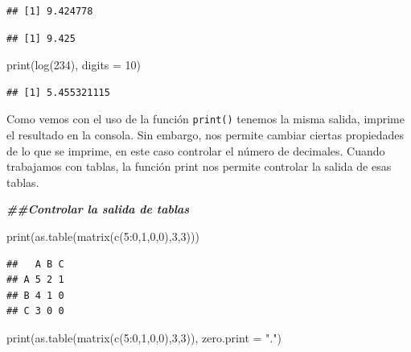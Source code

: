 \documentclass[
]{article}
\newenvironment{Shaded}{\begin{snugshade}}{\end{snugshade}}
\newcommand{\AttributeTok}[1]{\textcolor[rgb]{0.77,0.63,0.00}{#1}}
\newcommand{\DecValTok}[1]{\textcolor[rgb]{0.00,0.00,0.81}{#1}}
\newcommand{\DocumentationTok}[1]{\textcolor[rgb]{0.56,0.35,0.01}{\textbf{\textit{#1}}}}
\newcommand{\FunctionTok}[1]{\textcolor[rgb]{0.00,0.00,0.00}{#1}}
\newcommand{\NormalTok}[1]{#1}
\newcommand{\SpecialCharTok}[1]{\textcolor[rgb]{0.00,0.00,0.00}{#1}}
\newcommand{\StringTok}[1]{\textcolor[rgb]{0.31,0.60,0.02}{#1}}
\begin{document}
\begin{verbatim}
## [1] 9.424778
\end{verbatim}

\begin{verbatim}
## [1] 9.425
\end{verbatim}

\begin{Shaded}
\begin{Highlighting}[]
\FunctionTok{print}\NormalTok{(}\FunctionTok{log}\NormalTok{(}\DecValTok{234}\NormalTok{), }\AttributeTok{digits =} \DecValTok{10}\NormalTok{)}
\end{Highlighting}
\end{Shaded}

\begin{verbatim}
## [1] 5.455321115
\end{verbatim}

Como vemos con el uso de la función \texttt{print()} tenemos la misma
salida, imprime el resultado en la consola. Sin embargo, nos permite
cambiar ciertas propiedades de lo que se imprime, en este caso controlar
el número de decimales. Cuando trabajamos con tablas, la función print
nos permite controlar la salida de esas tablas.

\begin{Shaded}
\begin{Highlighting}[]
\DocumentationTok{\#\#Controlar la salida de tablas}

\FunctionTok{print}\NormalTok{(}\FunctionTok{as.table}\NormalTok{(}\FunctionTok{matrix}\NormalTok{(}\FunctionTok{c}\NormalTok{(}\DecValTok{5}\SpecialCharTok{:}\DecValTok{0}\NormalTok{,}\DecValTok{1}\NormalTok{,}\DecValTok{0}\NormalTok{,}\DecValTok{0}\NormalTok{),}\DecValTok{3}\NormalTok{,}\DecValTok{3}\NormalTok{)))}
\end{Highlighting}
\end{Shaded}

\begin{verbatim}
##   A B C
## A 5 2 1
## B 4 1 0
## C 3 0 0
\end{verbatim}

\begin{Shaded}
\begin{Highlighting}[]
\FunctionTok{print}\NormalTok{(}\FunctionTok{as.table}\NormalTok{(}\FunctionTok{matrix}\NormalTok{(}\FunctionTok{c}\NormalTok{(}\DecValTok{5}\SpecialCharTok{:}\DecValTok{0}\NormalTok{,}\DecValTok{1}\NormalTok{,}\DecValTok{0}\NormalTok{,}\DecValTok{0}\NormalTok{),}\DecValTok{3}\NormalTok{,}\DecValTok{3}\NormalTok{)), }\AttributeTok{zero.print =} \StringTok{"."}\NormalTok{)}
\end{Highlighting}
\end{Shaded}
\end{document}
